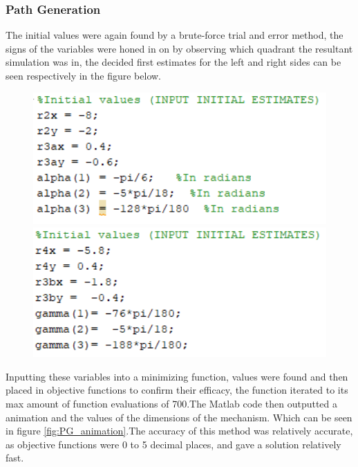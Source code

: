 \documentclass[12pt]{article}
\begin{document}
\subsubsection{Path Generation}
The initial values were again found by a brute-force trial and error method, the signs of the variables were honed in on by observing which quadrant the resultant simulation was in, the decided first estimates for the left and right sides can be seen respectively in the figure below.
\begin{figure}[H]
    \centering
    \begin{minipage}{.5\textwidth}
        \centering
        \includegraphics[width=1\textwidth]{PG_1.png}
    \end{minipage}%
    \begin{minipage}{0.5\textwidth}
        \centering
        \includegraphics[width=1\textwidth]{PG_2.png}
    \end{minipage}
\end{figure}

Inputting these variables into a minimizing function, values were found and then placed in objective functions to confirm their efficacy, the function iterated to its max amount of function evaluations of 700.The Matlab code then outputted a animation and the values of the dimensions of the mechanism. Which can be seen in figure \ref{fig:PG_animation}.The accuracy of this method was relatively accurate, as objective functions were 0 to 5 decimal places, and gave a solution relatively fast.
\end{document}
